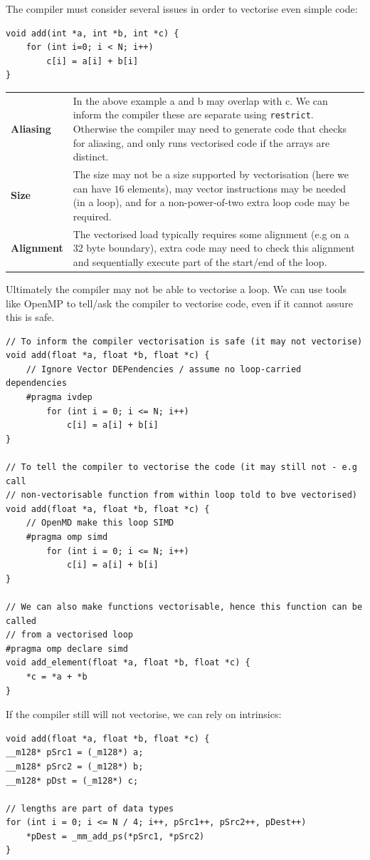 The compiler must consider several issues in order to vectorise even simple code:
\begin{verbatim}
void add(int *a, int *b, int *c) {
    for (int i=0; i < N; i++)
        c[i] = a[i] + b[i]
}
\end{verbatim}
\begin{center}
	\begin{tabular}{l p{}}
		\textbf{Aliasing}  & In the above example a and b may overlap with c. We can inform the compiler these are separate using \texttt{restrict}. Otherwise the compiler may need to generate code that checks for aliasing, and only runs vectorised code if the arrays are distinct. \\
		\textbf{Size}      & The size may not be a size supported by vectorisation (here we can have $16$ elements), may vector instructions may be needed (in a loop), and for a non-power-of-two extra loop code may be required.                                                              \\
		\textbf{Alignment} & The vectorised load typically requires some alignment (e.g on a 32 byte boundary), extra code may need to check this alignment and sequentially execute part of the start/end of the loop.                                                                          \\
	\end{tabular}
\end{center}
Ultimately the compiler may not be able to vectorise a loop. We can use tools like OpenMP to tell/ask the compiler to vectorise code, even if it cannot assure this is safe.
\begin{verbatim}
// To inform the compiler vectorisation is safe (it may not vectorise)
void add(float *a, float *b, float *c) {
    // Ignore Vector DEPendencies / assume no loop-carried dependencies
    #pragma ivdep
        for (int i = 0; i <= N; i++)
            c[i] = a[i] + b[i]
}

// To tell the compiler to vectorise the code (it may still not - e.g call 
// non-vectorisable function from within loop told to bve vectorised)
void add(float *a, float *b, float *c) {
    // OpenMD make this loop SIMD
    #pragma omp simd
        for (int i = 0; i <= N; i++)
            c[i] = a[i] + b[i]
}

// We can also make functions vectorisable, hence this function can be called 
// from a vectorised loop
#pragma omp declare simd
void add_element(float *a, float *b, float *c) {
    *c = *a + *b
}
\end{verbatim}
If the compiler still will not vectorise, we can rely on intrinsics:
\begin{verbatim}
void add(float *a, float *b, float *c) {
__m128* pSrc1 = (_m128*) a;
__m128* pSrc2 = (_m128*) b;
__m128* pDst = (_m128*) c;

// lengths are part of data types
for (int i = 0; i <= N / 4; i++, pSrc1++, pSrc2++, pDest++)
    *pDest = _mm_add_ps(*pSrc1, *pSrc2)
}
\end{verbatim}

